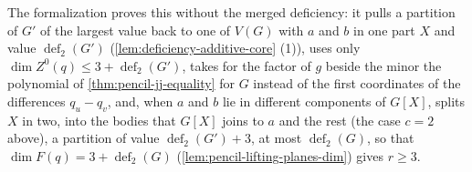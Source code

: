 \begin{fmlnote}
  The formalization proves this without the merged deficiency: it pulls a
  partition of $G'$ of the largest value back to one of $V(G)$ with $a$
  and $b$ in one part $X$ and value $\operatorname{def}_2(G')$
  (\cref{lem:deficiency-additive-core} (1)), uses only
  $\dim Z^0(q) \le 3 + \operatorname{def}_2(G')$, takes for the factor
  of $g$ beside the minor the polynomial of \cref{thm:pencil-jj-equality}
  for $G$ instead of the first coordinates of the differences
  $q_u - q_v$, and, when $a$ and $b$ lie in different components of
  $G[X]$, splits $X$ in two, into the bodies that $G[X]$ joins to $a$ and
  the rest (the case $c = 2$ above), a partition of value
  $\operatorname{def}_2(G') + 3$, at most $\operatorname{def}_2(G)$, so
  that $\dim F(q) = 3 + \operatorname{def}_2(G)$
  (\cref{lem:pencil-lifting-planes-dim}) gives $r \ge 3$.
\end{fmlnote}

